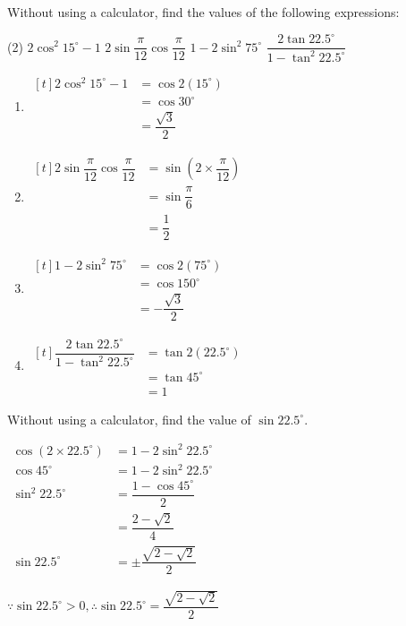 \documentclass{report}
\begin{document}
\newpage
\begin{question}
	Without using a calculator, find the values of the following expressions:
	\begin{tasks}[label=(\alph*)](2)
		\task $2 \cos ^2 15^{\circ}-1$
		\task $2 \sin \dfrac{\pi}{12} \cos \dfrac{\pi}{12}$
		\task $1-2 \sin ^2 75^{\circ}$
		\task $\dfrac{2 \tan 22.5^{\circ}}{1-\tan ^2 22.5^{\circ}}$
	\end{tasks}
	
	\sol{}
	\begin{enumerate}[label=(\alph*)]
		\item $\begin{aligned}[t]
		      2 \cos ^2 15^{\circ}-1 & =\cos 2\left(15^{\circ}\right) \\
		      & =\cos 30^{\circ} \\
		      & =\dfrac{\sqrt{3}}{2}
		\end{aligned}$
		\item $\begin{aligned}[t]
		      2 \sin \dfrac{\pi}{12} \cos \dfrac{\pi}{12} & =\sin \left(2 \times \dfrac{\pi}{12}\right) \\
		      & =\sin \dfrac{\pi}{6} \\
		      & =\dfrac{1}{2}
		\end{aligned}$
		\item $\begin{aligned}[t]
		      1-2 \sin ^2 75^{\circ} & =\cos 2\left(75^{\circ}\right) \\
		      & =\cos 150^{\circ} \\
		      & =-\dfrac{\sqrt{3}}{2}
		\end{aligned}$
		\item $\begin{aligned}[t]
		      \dfrac{2 \tan 22.5^{\circ}}{1-\tan ^2 22.5^{\circ}} & =\tan 2\left(22.5^{\circ}\right) \\
		      & =\tan 45^{\circ} \\
		      & =1
		\end{aligned}$
	\end{enumerate}
\end{question}

\begin{question}
	Without using a calculator, find the value of $\sin 22.5^{\circ}$.
	
	\sol{}
	    
	\noindent $\begin{aligned} \cos \left(2 \times 22.5^{\circ}\right) & =1-2 \sin ^2 22.5^{\circ} \\ \cos 45^{\circ} & =1-2 \sin ^2 22.5^{\circ} \\ \sin ^2 22.5^{\circ} & =\dfrac{1-\cos 45^{\circ}}{2} \\ & =\dfrac{2-\sqrt{2}}{4} \\ \sin 22.5^{\circ} & = \pm \dfrac{\sqrt{2-\sqrt{2}}}{2}\end{aligned}$
	
	\noindent $\because \sin 22.5^{\circ}>0, \therefore \sin 22.5^{\circ}=\dfrac{\sqrt{2-\sqrt{2}}}{2}$
\end{question}
\end{document}
